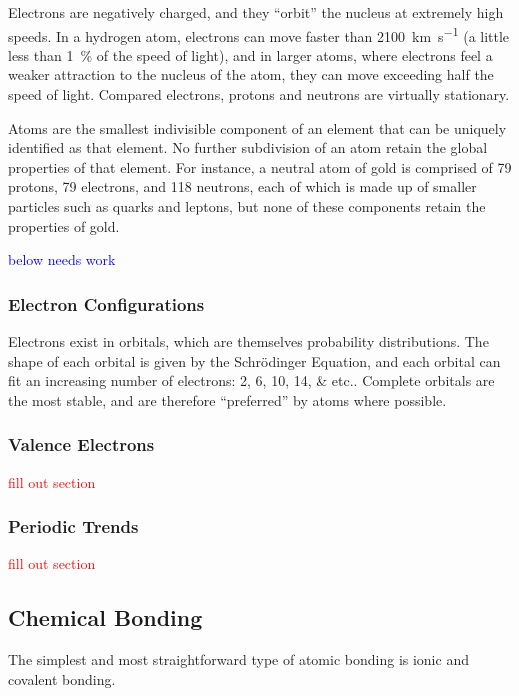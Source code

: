 Electrons are negatively charged, and they ``orbit'' the nucleus at extremely high speeds. In a hydrogen atom, electrons can move faster than \qty{2100}{\km\per\second} (a little less than \qty{1}{\percent} of the speed of light), and in larger atoms, where electrons feel a weaker attraction to the nucleus of the atom, they can move exceeding half the speed of light. Compared electrons, protons and neutrons are virtually stationary.

Atoms are the smallest indivisible component of an element that can be uniquely identified as that element. No further subdivision of an atom retain the global properties of that element. For instance, a neutral atom of gold is comprised of 79 protons, 79 electrons, and 118 neutrons, each of which is made up of smaller particles such as quarks and leptons, but none of these components retain the properties of gold.

\textcolor{blue}{below needs work}

\subsubsection{Electron Configurations}



Electrons exist in orbitals, which are themselves probability distributions. The shape of each orbital is given by the Schrödinger Equation, and each orbital can fit an increasing number of electrons: \numlist[list-final-separator = {, }, parse-numbers = false]{2;6;10;14;etc.}. Complete orbitals are the most stable, and are therefore ``preferred'' by atoms where possible.

\subsubsection{Valence Electrons}

\textcolor{red}{fill out section}

\subsubsection{Periodic Trends}

\textcolor{red}{fill out section}

\subsection{Chemical Bonding}

The simplest and most straightforward type of atomic bonding is ionic and covalent bonding.

